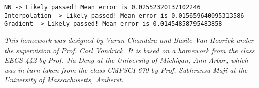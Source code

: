 \documentclass[11pt]{article}
\begin{document}
    \begin{Verbatim}[commandchars=\\\{\}]
NN -> Likely passed! Mean error is 0.02552320137102246
Interpolation -> Likely passed! Mean error is 0.015659640095313586
Gradient -> Likely passed! Mean error is 0.01454858795483858

    \end{Verbatim}

    \emph{This homework was designed by Varun Chanddra and Basile Van
Hoorick under the supervision of Prof. Carl Vondrick. It is based on a
homework from the class EECS 442 by Prof. Jia Deng at the University of
Michigan, Ann Arbor, which was in turn taken from the class CMPSCI 670
by Prof. Subhransu Maji at the University of Massachusetts, Amherst.}


    
    
    
    
\end{document}
